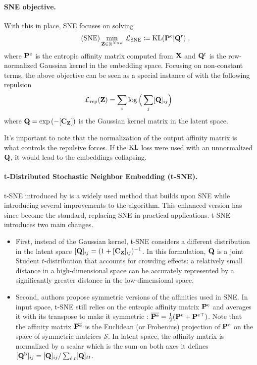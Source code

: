 \paragraph{SNE objective.}
With this in place, SNE focuses on solving
\begin{align}\label{eq:SNE_pb}\tag{SNE}
    \min_{{\mathbf{Z}} \in \mathbb{R}^{N \times d}} \: \mathcal{L}_{\mathrm{SNE}} \coloneqq \operatorname{KL}({\mathbf{P}}^{\mathrm{e}} | {\mathbf{Q}}^{\mathrm{r}}) \;,
\end{align}
where ${\mathbf{P}}^{\mathrm{e}}$ is the entropic affinity matrix computed from ${\mathbf{X}}$ and ${\mathbf{Q}}^{\mathrm{r}}$ is the row-normalized Gaussian kernel in the embedding space.
Focusing on non-constant terms, the above objective can be seen as a special instance of  with the following repulsion
\begin{align}
    \mathcal{L}_{\mathrm{rep}}({\mathbf{Z}}) = \sum_{i} \log \Big(\sum_j [{\mathbf{Q}}]_{ij} \Big)
\end{align}
where ${\mathbf{Q}} = \exp{(-[{\mathbf{C}}_{{\mathbf{Z}}}])}$ is the Gaussian kernel matrix in the latent space.

\begin{remark}\label{rem:norm_as_repulsion}
    It's important to note that the normalization of the output affinity matrix is what controls the repulsive forces. If the $\operatorname{KL}$ loss were used with an unnormalized ${\mathbf{Q}}$, it would lead to the embeddings collapsing.
\end{remark}

\paragraph{t-Distributed Stochastic Neighbor Embedding (t-SNE).} t-SNE introduced by \citet{van2008visualizing} is a widely used method that builds upon SNE while introducing several improvements to the algorithm. This enhanced version has since become the standard, replacing SNE in practical applications. t-SNE introduces two main changes. 
\begin{itemize}
    \item First, instead of the Gaussian kernel, t-SNE considers a different distribution in the latent space $[{\mathbf{Q}}]_{ij} = (1 + [\mathbf{C}_{\mathbf{Z}}]_{ij})^{-1}$. In this formulation, ${\mathbf{Q}}$ is a joint Student $t$-distribution that accounts for crowding effects: a relatively small
    distance in a high-dimensional space can be accurately represented by a
    significantly greater distance in the low-dimensional space. 
    \item Second, authors propose symmetric versions of the affinities used in SNE. In input space, t-SNE still relies on the entropic affinity matrix ${\mathbf{P}}^{\mathrm{e}}$ and averages it with its transpose to make it symmetric : 
    $\overline{{\mathbf{P}}^{\mathrm{e}}} = \frac{1}{2}({\mathbf{P}}^{\mathrm{e}} + {\mathbf{P}}^{\mathrm{e} \top})$. Note that the affinity matrix $\overline{{\mathbf{P}}^{\mathrm{e}}}$ is the Euclidean (or Frobenius) projection of ${\mathbf{P}}^{\mathrm{e}}$ on the space of symmetric matrices $\mathcal{S}$. In latent space, the affinity matrix is normalized by a scalar which is the sum on both axes \ie it defines $[{\mathbf{Q}}^{\mathrm{b}}]_{ij} = [{\mathbf{Q}}]_{ij} /\sum_{\ell,t}[{\mathbf{Q}}]_{\ell t}$.
\end{itemize}

